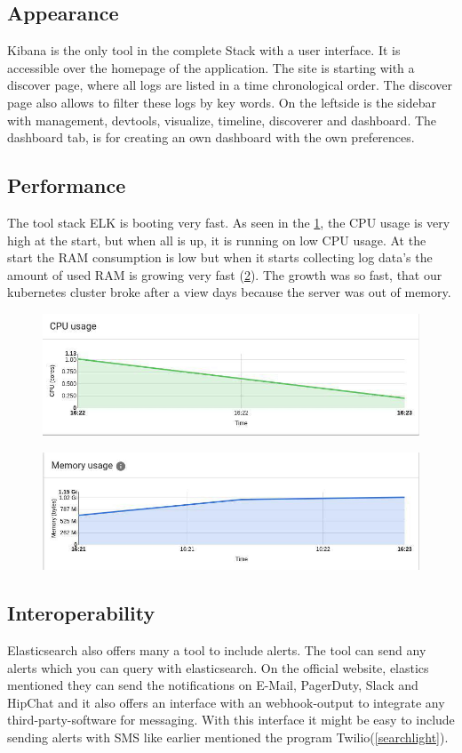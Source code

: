 \subsection{Appearance}%
Kibana is the only tool in the complete Stack with a user interface. It is accessible over the homepage of the application. The site is starting with a discover page, where all logs are listed in a time chronological order. The discover page also allows to filter these logs by key words. On the leftside is the sidebar with management, devtools, visualize, timeline, discoverer and dashboard. The dashboard tab, is for creating an own dashboard with the own preferences.
\subsection{Performance}
The tool stack ELK is booting very fast. As seen in the \cref{fig:ELK_CPU}, the CPU usage is very high at the start, but when all is up, it is running on low CPU usage. At the start the RAM consumption is low but when it starts collecting log data's the amount of used RAM is growing very fast (\cref{fig:ELK_MEM}). The growth was so fast, that our kubernetes cluster broke after a view days because the server was out of memory.
\begin{figure}
	\centering
	\includegraphics[width=0.7\linewidth]{Bilder/Performance/ELK_CPU}
	\caption{}
	\label{fig:ELK_CPU}
\end{figure}
\begin{figure}
	\centering
	\includegraphics[width=0.7\linewidth]{Bilder/Performance/ELK_MEM}
	\caption{}
	\label{fig:ELK_MEM}
\end{figure}
\subsection{Interoperability}
Elasticsearch also offers many a tool to include alerts. The tool can send any alerts which you can query with elasticsearch. On the official website, elastics mentioned they can send the notifications on E-Mail, PagerDuty, Slack and HipChat and it also offers an interface with an webhook-output to integrate any third-party-software for messaging. With this interface it might be easy to include sending alerts with SMS like earlier mentioned the program Twilio(\ref{searchlight}).

